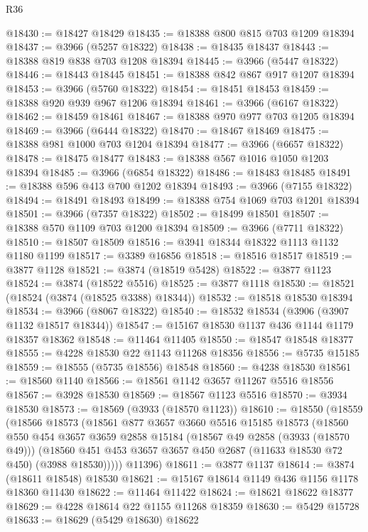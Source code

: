 \begin{lexlean}{R36}
\begin{coremodule}
@18430 := @18427 @18429
@18435 := @18388 @800 @815 @703 @1209 @18394
@18437 := @3966 (@5257 @18322)
@18438 := @18435 @18437
@18443 := @18388 @819 @838 @703 @1208 @18394
@18445 := @3966 (@5447 @18322)
@18446 := @18443 @18445
@18451 := @18388 @842 @867 @917 @1207 @18394
@18453 := @3966 (@5760 @18322)
@18454 := @18451 @18453
@18459 := @18388 @920 @939 @967 @1206 @18394
@18461 := @3966 (@6167 @18322)
@18462 := @18459 @18461
@18467 := @18388 @970 @977 @703 @1205 @18394
@18469 := @3966 (@6444 @18322)
@18470 := @18467 @18469
@18475 := @18388 @981 @1000 @703 @1204 @18394
@18477 := @3966 (@6657 @18322)
@18478 := @18475 @18477
@18483 := @18388 @567 @1016 @1050 @1203 @18394
@18485 := @3966 (@6854 @18322)
@18486 := @18483 @18485
@18491 := @18388 @596 @413 @700 @1202 @18394
@18493 := @3966 (@7155 @18322)
@18494 := @18491 @18493
@18499 := @18388 @754 @1069 @703 @1201 @18394
@18501 := @3966 (@7357 @18322)
@18502 := @18499 @18501
@18507 := @18388 @570 @1109 @703 @1200 @18394
@18509 := @3966 (@7711 @18322)
@18510 := @18507 @18509
@18516 := @3941 @18344 @18322 @1113 @1132 @1180 @1199
@18517 := @3389 @16856
@18518 := @18516 @18517
@18519 := @3877 @1128
@18521 := @3874 (@18519 @5428)
@18522 := @3877 @1123
@18524 := @3874 (@18522 @5516)
@18525 := @3877 @1118
@18530 := @18521 (@18524 (@3874 (@18525 @3388) @18344))
@18532 := @18518 @18530 @18394
@18534 := @3966 (@8067 @18322)
@18540 := @18532 @18534 (@3906 (@3907 @1132 @18517 @18344))
@18547 := @15167 @18530 @1137 @436 @1144 @1179 @18357 @18362
@18548 := @11464 @11405
@18550 := @18547 @18548 @18377
@18555 := @4228 @18530 @22 @1143 @11268 @18356
@18556 := @5735 @15185
@18559 := @18555 (@5735 @18556) @18548
@18560 := @4238 @18530
@18561 := @18560 @1140
@18566 := @18561 @1142 @3657 @11267 @5516 @18556
@18567 := @3928 @18530
@18569 := @18567 @1123 @5516
@18570 := @3934 @18530
@18573 := @18569 (@3933 (@18570 @1123))
@18610 := @18550
    (@18559
      (@18566
        @18573
        (@18561
          @877
          @3657
          @3660
          @5516
          @15185
          @18573
          (@18560
            @550
            @454
            @3657
            @3659
            @2858
            @15184
            (@18567 @49 @2858 (@3933 (@18570 @49)))
            (@18560 @451 @453 @3657 @3657 @450 @2687 (@11633 @18530 @72 @450) (@3988 @18530)))))
      @11396)
@18611 := @3877 @1137
@18614 := @3874 (@18611 @18548) @18530
@18621 := @15167 @18614 @1149 @436 @1156 @1178 @18360 @11430
@18622 := @11464 @11422
@18624 := @18621 @18622 @18377
@18629 := @4228 @18614 @22 @1155 @11268 @18359
@18630 := @5429 @15728
@18633 := @18629 (@5429 @18630) @18622

\end{coremodule}
\end{lexlean}
